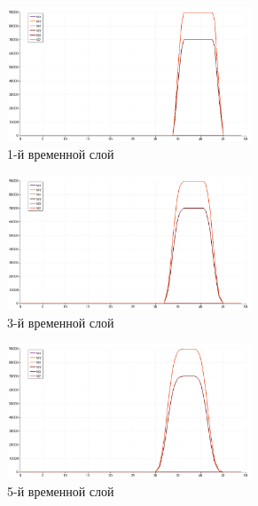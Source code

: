 \begin{figure}[htp]
\begin{subfigure}[b]{0.5\textwidth}
\centering
\includegraphics[width=0.8\textwidth]{png/p-wave-test/s/0001.png}
\caption{1-й временной слой}
\end{subfigure}
\begin{subfigure}[b]{0.5\textwidth}
\centering
\includegraphics[width=0.8\textwidth]{png/p-wave-test/s/0003.png}
\caption{3-й временной слой}
\end{subfigure}
\begin{subfigure}[b]{0.5\textwidth}
\centering
\includegraphics[width=0.8\textwidth]{png/p-wave-test/s/0005.png}
\caption{5-й временной слой}
\end{subfigure}
\begin{subfigure}[b]{0.5\textwidth}
\centering

\end{subfigure}
\end{figure}
